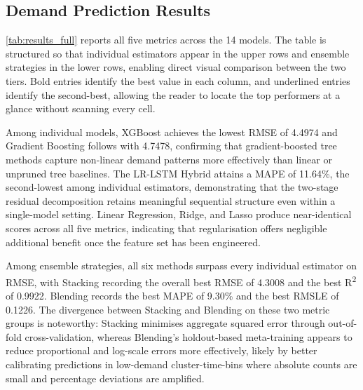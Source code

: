 \documentclass[a4paper,fleqn]{cas-dc}
\begin{document}
\subsection{Demand Prediction Results}

\autoref{tab:results_full} reports all five metrics across the 14 models.  The table is structured so that individual estimators appear in the upper rows and ensemble strategies in the lower rows, enabling direct visual comparison between the two tiers.  Bold entries identify the best value in each column, and underlined entries identify the second-best, allowing the reader to locate the top performers at a glance without scanning every cell.

Among individual models, XGBoost achieves the lowest RMSE of 4.4974 and Gradient Boosting follows with 4.7478, confirming that gradient-boosted tree methods capture non-linear demand patterns more effectively than linear or unpruned tree baselines.  The LR-LSTM Hybrid attains a MAPE of 11.64\%, the second-lowest among individual estimators, demonstrating that the two-stage residual decomposition retains meaningful sequential structure even within a single-model setting.  Linear Regression, Ridge, and Lasso produce near-identical scores across all five metrics, indicating that regularisation offers negligible additional benefit once the feature set has been engineered.

Among ensemble strategies, all six methods surpass every individual estimator on RMSE, with Stacking recording the overall best RMSE of 4.3008 and the best R\textsuperscript{2} of 0.9922.  Blending records the best MAPE of 9.30\% and the best RMSLE of 0.1226.  The divergence between Stacking and Blending on these two metric groups is noteworthy: Stacking minimises aggregate squared error through out-of-fold cross-validation, whereas Blending's holdout-based meta-training appears to reduce proportional and log-scale errors more effectively, likely by better calibrating predictions in low-demand cluster-time-bins where absolute counts are small and percentage deviations are amplified.
\end{document}
